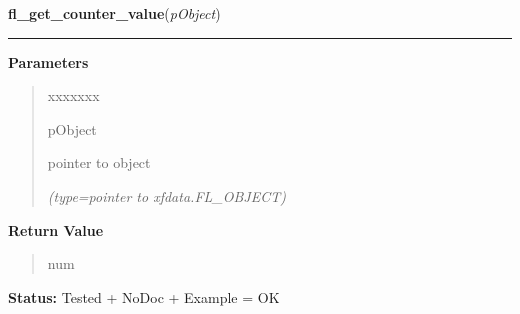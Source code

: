 \hspace{.8\funcindent}\begin{boxedminipage}{\funcwidth}

    \raggedright \textbf{fl\_get\_counter\_value}(\textit{pObject})

    \vspace{-1.5ex}

    \rule{\textwidth}{0.5\fboxrule}
\setlength{\parskip}{2ex}
\setlength{\parskip}{1ex}
      \textbf{Parameters}
      \vspace{-1ex}

      \begin{quote}
        \begin{Ventry}{xxxxxxx}

          \item[pObject]

          pointer to object

            {\it (type=pointer to xfdata.FL\_OBJECT)}

        \end{Ventry}

      \end{quote}

      \textbf{Return Value}
    \vspace{-1ex}

      \begin{quote}
      num

      \end{quote}

\textbf{Status:} Tested + NoDoc + Example = OK



    \end{boxedminipage}

    \label{xformslib:library:fl_get_counter_bounds}

    \vspace{0.5ex}

